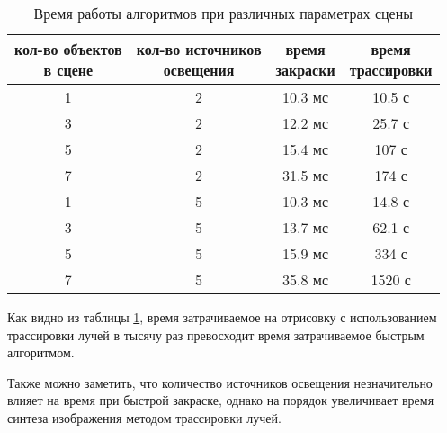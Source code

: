 \begin{table}[h]
	\caption{Время работы алгоритмов при различных параметрах сцены}
	\begin{center}
		\begin{tabular}{|c|c|c|c|}
			\hline
			\specialcell{кол-во объектов \\ в сцене} &
			\specialcell{кол-во источников \\ освещения} &
			\specialcell{время \\ закраски} &
			\specialcell{время \\ трассировки} \\
			\hline
			1 & 2 & 10.3 мс & 10.5 с \\
			\hline
			3 & 2 & 12.2 мс & 25.7 с \\
			\hline
			5 & 2 & 15.4 мс & 107 с \\
			\hline
			7 & 2 & 31.5 мс & 174 с \\
			\hline
			1 & 5 & 10.3 мс & 14.8 с \\
			\hline
			3 & 5 & 13.7 мс & 62.1 с \\
			\hline
			5 & 5 & 15.9 мс & 334 с \\
			\hline
			7 & 5 & 35.8 мс & 1520 с \\
			\hline
		\end{tabular}
	\end{center}
	\label{exp:res}
\end{table}

Как видно из таблицы \ref{exp:res}, время затрачиваемое на отрисовку с использованием трассировки лучей в тысячу раз превосходит время затрачиваемое быстрым алгоритмом.

Также можно заметить, что количество источников освещения незначительно влияет на время при быстрой закраске, однако на порядок увеличивает время синтеза изображения методом трассировки лучей.
